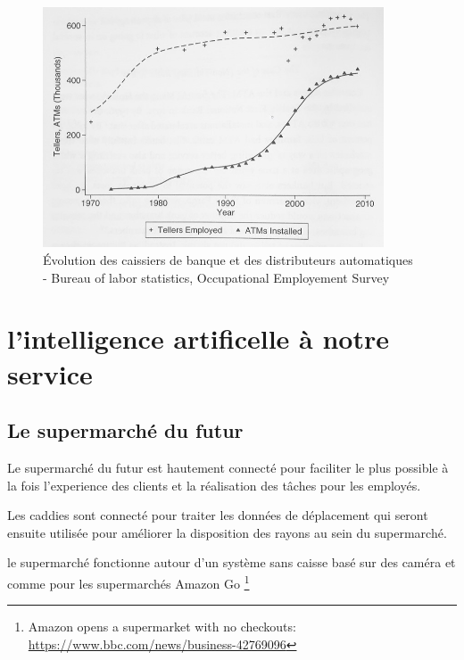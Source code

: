         \begin{figure}[H]
            \centering
            \includegraphics[width=0.9\textwidth]{Images/bankteller}
            \caption{Évolution des caissiers de banque et des distributeurs automatiques - 
            Bureau of labor statistics, Occupational Employement Survey }
            \label{fig:banktellerevolution}
        \end{figure}


    \chapter{l'intelligence artificelle à notre service}
    \section{Le supermarché du futur}
    Le supermarché du futur est hautement connecté pour faciliter le plus possible 
    à la fois l'experience des clients et la réalisation des tâches pour 
    les employés. 

    Les caddies sont connecté pour traiter les données de déplacement qui seront 
    ensuite utilisée pour améliorer la disposition des rayons au sein du supermarché.

    le supermarché fonctionne autour d'un système sans caisse basé sur des caméra 
    et comme pour les supermarchés Amazon Go 
    \footnote{Amazon opens a supermarket with no checkouts:  \url{https://www.bbc.com/news/business-42769096}} 
    \newline

